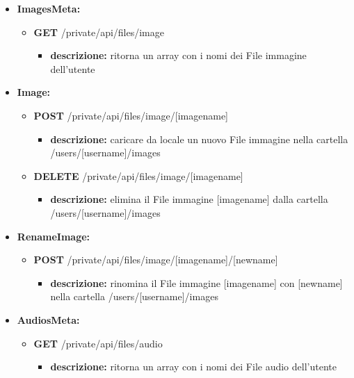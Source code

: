 {\begin{itemize}
			
			
		\item \textbf{ImagesMeta:}
			\begin{itemize}
			\item   \textbf{GET} /private/api/files/image 
				\begin{itemize} 
				\item \textbf{descrizione:} ritorna un array con i nomi dei File immagine dell'utente
				\end{itemize}
			\end{itemize}
			
		\item \textbf{Image:}
			\begin{itemize}
			\item    \textbf{POST} /private/api/files/image/[imagename]
				\begin{itemize} 
				\item \textbf{descrizione:} caricare da locale un nuovo File immagine nella cartella /users/[username]/images					
				\end{itemize}
			\item   \textbf{DELETE} /private/api/files/image/[imagename]
				\begin{itemize} 
				\item \textbf{descrizione:} elimina il File immagine [imagename] dalla cartella /users/[username]/images			
				\end{itemize}
			\end{itemize}
			
		\item \textbf{RenameImage:}
			\begin{itemize}
			\item   \textbf{POST} /private/api/files/image/[imagename]/[newname] 
				\begin{itemize} 
				\item \textbf{descrizione:} rinomina il File immagine [imagename] con [newname] nella cartella /users/[username]/images
				\end{itemize}
			\end{itemize}
			
		\item \textbf{AudiosMeta:}
			\begin{itemize}
			\item   \textbf{GET} /private/api/files/audio
				\begin{itemize} 
				\item \textbf{descrizione:} ritorna un array con i nomi dei File audio dell'utente
				\end{itemize}
			\end{itemize}
			

\end{itemize}}
